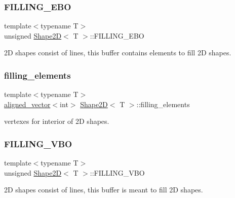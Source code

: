 \subsubsection{\texorpdfstring{F\+I\+L\+L\+I\+N\+G\+\_\+\+E\+BO}{FILLING\_EBO}}
{\footnotesize\ttfamily template$<$typename T$>$ \\
unsigned \mbox{\hyperlink{classShape2D}{Shape2D}}$<$ T $>$\+::F\+I\+L\+L\+I\+N\+G\+\_\+\+E\+BO\hspace{0.3cm}{\ttfamily [protected]}}

2D shapes consist of lines, this buffer contains elements to fill 2D shapes. \mbox{\label{classShape2D_a28d0d6018cb6b73637050d9f3fb1f006}} 
\subsubsection{\texorpdfstring{filling\+\_\+elements}{filling\_elements}}
{\footnotesize\ttfamily template$<$typename T$>$ \\
\mbox{\hyperlink{type__definitions_8hpp_a087efd587d66b881646ef378f1919c90}{aligned\+\_\+vector}}$<$int$>$ \mbox{\hyperlink{classShape2D}{Shape2D}}$<$ T $>$\+::filling\+\_\+elements\hspace{0.3cm}{\ttfamily [protected]}}

vertexes for interior of 2D shapes. \mbox{\label{classShape2D_a220cf4cf96da8bd43627ffffd00a0718}} 
\subsubsection{\texorpdfstring{F\+I\+L\+L\+I\+N\+G\+\_\+\+V\+BO}{FILLING\_VBO}}
{\footnotesize\ttfamily template$<$typename T$>$ \\
unsigned \mbox{\hyperlink{classShape2D}{Shape2D}}$<$ T $>$\+::F\+I\+L\+L\+I\+N\+G\+\_\+\+V\+BO\hspace{0.3cm}{\ttfamily [protected]}}

2D shapes consist of lines, this buffer is meant to fill 2D shapes. \mbox{\label{classShape2D_ae3e216c9d8422b47f46bff9259bd17be}} 
